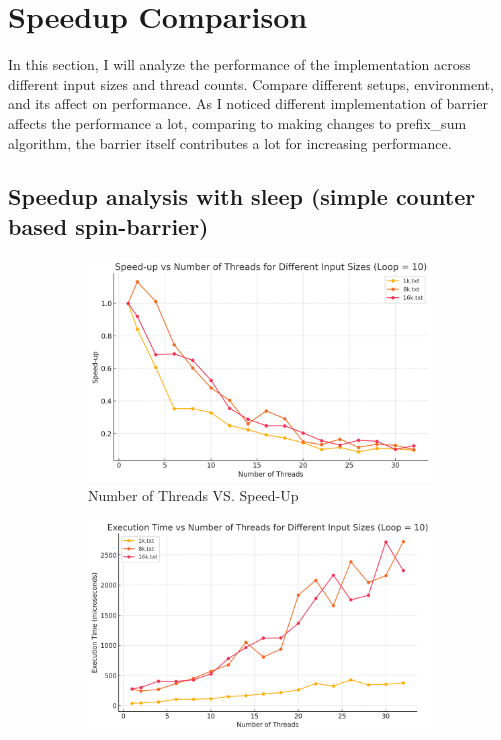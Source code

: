 \documentclass[letterpaper,12pt]{article}
\theoremstyle{remark}
\begin{document}
\section{Speedup Comparison}
In this section, I will analyze the performance of the implementation across different input sizes and thread counts. Compare different setups, environment, and its affect on performance. As I noticed different implementation of barrier affects the performance a lot, comparing to making changes to prefix\_sum algorithm, the barrier itself contributes a lot for increasing performance.
\subsection{Speedup analysis with sleep (simple counter based spin-barrier) }

\begin{figure}[H]
    \centering
    \begin{subfigure}[t]{0.48\textwidth}  %
        \centering
        \includegraphics[width=\textwidth]{loop10Sleep.png}
        \caption{Number of Threads VS. Speed-Up}
        \label{fig:ThreadVsSpeedUp1}
    \end{subfigure}
    \hfill  %
    \begin{subfigure}[t]{0.48\textwidth}  %
        \centering
        \includegraphics[width=\textwidth]{loop10ExecutionTime.png}

\end{subfigure}
\end{figure}
\end{document}
